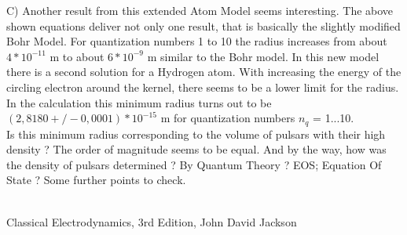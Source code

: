 \documentclass[10pt,titlepage]{article}
\begin{document}
C) Another result from this extended Atom Model seems interesting. The above shown equations deliver not only one result, that is basically the slightly modified Bohr Model. For quantization numbers 1 to 10 the radius increases from about $4*10^{-11}$ m to about $6*10^{-9}$ m  similar to the Bohr model. In this new model there is a second solution for a Hydrogen atom. With increasing the energy of the circling electron around the kernel, there seems to be a lower limit for the radius. In the calculation this minimum radius turns out to be $(2,8180  +/-0,0001)*10^{-15}$ m for quantization numbers $n_q$ = 1...10.\\
Is this minimum radius corresponding to the volume of pulsars with their high density ?  The order of magnitude seems to be equal. And by the way, how was the density of pulsars determined ?  By Quantum Theory ? EOS; Equation Of State ? Some further points to check.
\\
\\



\begin{thebibliography}{100}
   Classical Electrodynamics,  3rd Edition, John David Jackson
\end{thebibliography}
\end{document}
